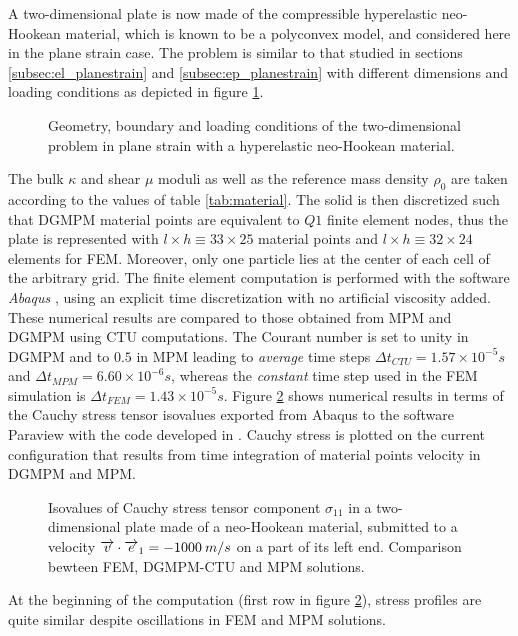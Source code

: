 A two-dimensional plate is now made of the compressible hyperelastic neo-Hookean material, which is known to be a polyconvex model, and considered here in the plane strain case. The problem is similar to that studied in sections \ref{subsec:el_planestrain} and \ref{subsec:ep_planestrain} with different dimensions and loading conditions as depicted in figure \ref{fig:2d_heDomain}.
\begin{figure}[h!]
  \centering
  
  \caption{Geometry, boundary and loading conditions of the two-dimensional problem in plane strain with a hyperelastic neo-Hookean material.}
  \label{fig:2d_heDomain}
\end{figure}
The bulk $\kappa$ and shear $\mu$ moduli as well as the reference mass density $\rho_0$ are taken according to the values of table \ref{tab:material}.  The solid is then discretized such that DGMPM material points are equivalent to $Q1$ finite element nodes, thus the plate is represented with $l \times h \equiv 33 \times 25$ material points and $l \times h \equiv 32 \times 24$ elements for FEM. Moreover, only one particle lies at the center of each cell of the arbitrary grid. The finite element computation is performed with the software \textit{Abaqus} \cite{Abaqus}, using an explicit time discretization with no artificial viscosity added. These numerical results are compared to those obtained from MPM and DGMPM using CTU computations. The Courant number is set to unity in DGMPM and to $0.5$ in MPM leading to \textit{average} time steps $\Delta t_{CTU}=1.57 \times 10^{-5}s$ and $\Delta t_{MPM}=6.60 \times 10^{-6}s$, whereas the \textit{constant} time step used in the FEM simulation is $\Delta t_ {FEM}=1.43 \times 10^{-5} s$. Figure \ref{fig:2dhe_stress} shows numerical results in terms of the Cauchy stress tensor isovalues exported from Abaqus to the software Paraview \cite{Paraview} with the code developed in \cite{Export_Abaqus}. Cauchy stress is plotted on the current configuration that results from time integration of material points velocity in DGMPM and MPM.
\begin{figure}[h!]
  \centering
  
  \caption{Isovalues of Cauchy stress tensor component $\sigma_{11}$ in a two-dimensional plate made of a neo-Hookean material, submitted to a velocity ${\overrightarrow{v}}\cdot{\overrightarrow{e}}_1=-1000 \: m/s$ on a part of its left end. Comparison bewteen FEM, DGMPM-CTU and MPM solutions.}
  \label{fig:2dhe_stress}
\end{figure}
At the beginning of the computation (first row in figure \ref{fig:2dhe_stress}), stress profiles are quite similar despite oscillations in FEM and MPM solutions. 

